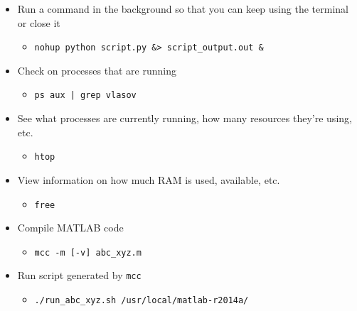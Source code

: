 \documentclass[11pt,a4paper]{report}
\begin{document}
\begin{itemize}

\item Run a command in the background so that you can keep using the terminal or close it
  \begin{itemize}
  \item \texttt{nohup python script.py \&> script\_output.out \&}
  \end{itemize}

\item Check on processes that are running
  \begin{itemize}
  \item \texttt{ps aux | grep vlasov}
  \end{itemize}

\item See what processes are currently running, how many resources they're using, etc.
  \begin{itemize}
  \item \texttt{htop}
  \end{itemize}

\item View information on how much RAM is used, available, etc.
  \begin{itemize}
  \item \texttt{free}
  \end{itemize}

\item Compile MATLAB code
  \begin{itemize}
  \item \texttt{mcc -m [-v] abc\_xyz.m}
  \end{itemize}

\item Run script generated by \texttt{mcc}
  \begin{itemize}
  \item \texttt{./run\_abc\_xyz.sh /usr/local/matlab-r2014a/}
  \end{itemize}

\end{itemize}
\end{document}
